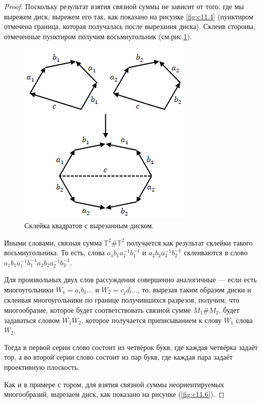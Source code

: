 \begin{proof}
    Поскольку результат взятия связной суммы не зависит от того, где мы вырежем диск, вырежем его так, как показано на рисунке \ref{fig:c11.4} (пунктиром отмечена граница, которая получалась после вырезания диска). Склеив стороны, отмеченные пунктиром получим восьмиугольник (см.рис.\ref{fig:c11.5}).

    \begin{figure}[ht]
        \centering
        \includegraphics[scale=0.7]{images/c11.5.png}
        \caption{Склейка квадратов с вырезанным диском.}
        \label{fig:c11.5}
    \end{figure}

    Иными словами, связная сумма $\mathbb{T}^2 \# \mathbb{T}^2$ получается как результат склейки такого восьмиугольника. То есть, слова $a_1 b_1 a_1^{-1} b_1^{-1}$ и $a_2 b_2 a_2^{-1} b_2^{-1}$ склеиваются в слово $a_1 b_1 a_1^{-1} b_1^{-1} a_2 b_2 a_2^{-1} b_2^{-1}$.

    Для произвольных двух слов рассуждения совершенно аналогичные — если есть многоугольники $W_1 = a_i b_k \dots$ и $W_2 = c_j d_l \dots$, то, вырезая таким образом диски и склеивая многоугольники по границе получившихся разрезов, получим, что многообразие, которое будет соответствовать связной сумме $M_1 \# M_2$, будет задаваться словом $W_1 W_2$, которое получается приписыванием к слову $W_1$ слова $W_2$.

    Тогда в первой серии слово состоит из четвёрок букв, где каждая четвёрка задаёт тор, а во второй серии слово состоит из пар букв, где каждая пара задаёт проективную плоскость.

    Как и в примере с тором, для взятия связной суммы неориентируемых многообразий, вырезаем диск, как показано на рисунке (\ref{fig:c11.6}).


\end{proof}
